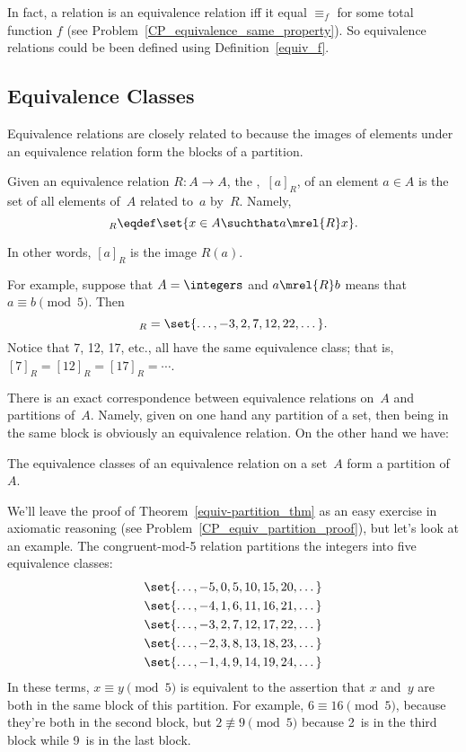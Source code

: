 In fact, a relation is an equivalence relation iff it equal $\equiv_f$
for some total function $f$ (see
Problem~\ref{CP_equivalence_same_property}).  So equivalence relations
could be been defined using Definition~\ref{equiv_f}.

\subsection{Equivalence Classes}

Equivalence relations are closely related to  because the
images of elements under an equivalence relation form the blocks of a
partition.

\begin{definition}\label{def:equiv_class}
Given an equivalence relation $R : A \to A$, the ,~$[a]_R$, of an element $a \in A$  is the set of all elements of~$A$
related to~$a$ by~$R$.  Namely,
\begin{equation*}
    [a]_R \eqdef \set{x \in A \suchthat a \mrel{R} x}.
\end{equation*}
\end{definition}
In other words, $[a]_R$ is the image $R(a)$.

For example, suppose that $A = \integers$ and $a \mrel{R} b$ means
that $a \equiv b \pmod{5}$.  Then
\begin{equation*}
    [7]_R = \set{\dots, -3, 2, 7, 12, 22, \dots}.
\end{equation*}
Notice that 7, 12, 17, etc., all have the same equivalence class; that
is, $[7]_R = [12]_R = [17]_R = \cdots$.

There is an exact correspondence between equivalence relations on~$A$
and partitions of~$A$.  Namely, given on one hand any partition of a
set, then being in the same block is obviously an equivalence
relation.  On the other hand we have:
\begin{theorem}\label{equiv-partition_thm}
The equivalence classes of an equivalence relation on a set~$A$ form a
partition of~$A$.
\end{theorem}

We'll leave the proof of Theorem~\ref{equiv-partition_thm} as an easy
exercise in axiomatic reasoning (see
Problem~\ref{CP_equiv_partition_proof}), but let's look at an example.
The congruent-mod-5 relation partitions the integers into five
equivalence classes:
\begin{gather*}
    \set{ \dots, -5, 0, 5, 10, 15, 20, \dots } \\
    \set{ \dots, -4, 1, 6, 11, 16, 21, \dots } \\
    \set{ \dots, -3, 2, 7, 12, 17, 22, \dots } \\
    \set{ \dots, -2, 3, 8, 13, 18, 23, \dots } \\
    \set{ \dots, -1, 4, 9, 14, 19, 24, \dots }
\end{gather*}
In these terms, $x \equiv y \pmod{5}$ is equivalent to the assertion
that $x$ and~$y$ are both in the same block of this partition.  For
example, $6 \equiv 16 \pmod{5}$, because they're both in the second
block, but $2 \not\equiv 9 \pmod{5}$ because 2~is in the third block
while 9~is in the last block.

